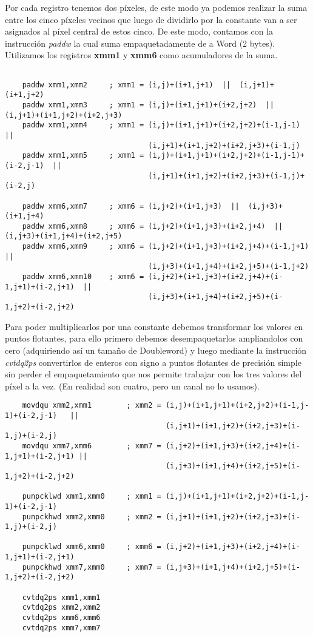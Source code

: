 \documentclass[a4paper]{article}
\begin{document}
\indent Por cada registro tenemos dos p\'ixeles, de este modo ya podemos realizar la suma entre los cinco p\'ixeles vecinos que luego de dividirlo por la constante van a ser asignados al p\'ixel central de estos cinco. De este modo, contamos con la instrucci\'on \textit{paddw} la cual suma empaquetadamente de a Word (2 bytes). Utilizamos los registros \textbf{xmm1} y \textbf{xmm6} como acumuladores de la suma.
 \begin{codesnippet}
\begin{verbatim}

    paddw xmm1,xmm2     ; xmm1 = (i,j)+(i+1,j+1)  ||  (i,j+1)+(i+1,j+2)
    paddw xmm1,xmm3     ; xmm1 = (i,j)+(i+1,j+1)+(i+2,j+2)  ||  (i,j+1)+(i+1,j+2)+(i+2,j+3)
    paddw xmm1,xmm4     ; xmm1 = (i,j)+(i+1,j+1)+(i+2,j+2)+(i-1,j-1)  ||
                                 (i,j+1)+(i+1,j+2)+(i+2,j+3)+(i-1,j)
    paddw xmm1,xmm5     ; xmm1 = (i,j)+(i+1,j+1)+(i+2,j+2)+(i-1,j-1)+(i-2,j-1)  ||
                                 (i,j+1)+(i+1,j+2)+(i+2,j+3)+(i-1,j)+(i-2,j)

    paddw xmm6,xmm7     ; xmm6 = (i,j+2)+(i+1,j+3)  ||  (i,j+3)+(i+1,j+4)
    paddw xmm6,xmm8     ; xmm6 = (i,j+2)+(i+1,j+3)+(i+2,j+4)  ||  (i,j+3)+(i+1,j+4)+(i+2,j+5)
    paddw xmm6,xmm9     ; xmm6 = (i,j+2)+(i+1,j+3)+(i+2,j+4)+(i-1,j+1)  ||
                                 (i,j+3)+(i+1,j+4)+(i+2,j+5)+(i-1,j+2)
    paddw xmm6,xmm10    ; xmm6 = (i,j+2)+(i+1,j+3)+(i+2,j+4)+(i-1,j+1)+(i-2,j+1)  ||
                                 (i,j+3)+(i+1,j+4)+(i+2,j+5)+(i-1,j+2)+(i-2,j+2)
\end{verbatim}
\end{codesnippet}

\indent Para poder multiplicarlos por una constante debemos transformar los valores en puntos flotantes, para ello primero debemos desempaquetarlos ampliandolos con cero (adquiriendo as\'i un tama\~no de Doubleword) y luego mediante la instrucci\'on \textit{cvtdq2ps} convertirlos de enteros con signo a puntos flotantes de precisi\'on simple sin perder el empaquetamiento que nos permite trabajar con los tres valores del p\'ixel a la vez. (En realidad son cuatro, pero un canal no lo usamos).
 \begin{codesnippet}
\begin{verbatim}
    movdqu xmm2,xmm1        ; xmm2 = (i,j)+(i+1,j+1)+(i+2,j+2)+(i-1,j-1)+(i-2,j-1)   ||
                                     (i,j+1)+(i+1,j+2)+(i+2,j+3)+(i-1,j)+(i-2,j)
    movdqu xmm7,xmm6        ; xmm7 = (i,j+2)+(i+1,j+3)+(i+2,j+4)+(i-1,j+1)+(i-2,j+1) ||
                                     (i,j+3)+(i+1,j+4)+(i+2,j+5)+(i-1,j+2)+(i-2,j+2)

    punpcklwd xmm1,xmm0     ; xmm1 = (i,j)+(i+1,j+1)+(i+2,j+2)+(i-1,j-1)+(i-2,j-1)
    punpckhwd xmm2,xmm0     ; xmm2 = (i,j+1)+(i+1,j+2)+(i+2,j+3)+(i-1,j)+(i-2,j)

    punpcklwd xmm6,xmm0     ; xmm6 = (i,j+2)+(i+1,j+3)+(i+2,j+4)+(i-1,j+1)+(i-2,j+1)
    punpckhwd xmm7,xmm0     ; xmm7 = (i,j+3)+(i+1,j+4)+(i+2,j+5)+(i-1,j+2)+(i-2,j+2)

    cvtdq2ps xmm1,xmm1  
    cvtdq2ps xmm2,xmm2  
    cvtdq2ps xmm6,xmm6  
    cvtdq2ps xmm7,xmm7
\end{verbatim}
\end{codesnippet}
\end{document}
